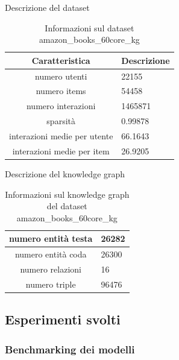 \noindent Descrizione del dataset
\begin{table}[H]
    \centering
    \footnotesize
    \begin{tabularx}{\textwidth}{|c|X|}
        \hline
        \textbf{Caratteristica} & \textbf{Descrizione} \\
        \hline
        numero utenti & 22155 \\
        \hline
        numero items & 54458 \\
        \hline
        numero interazioni & 1465871 \\
        \hline
        sparsità & 0.99878 \\
        \hline
        interazioni medie per utente & 66.1643\\
        \hline
        interazioni medie per item & 26.9205 \\
        \hline
    \end{tabularx}
    \caption{Informazioni sul dataset amazon\_books\_60core\_kg}
    \label{tab:dataset_info}
\end{table}

\noindent Descrizione del knowledge graph
\begin{table}[H]
    \centering
    \footnotesize
    \begin{tabularx}{\textwidth}{|c|X|}
        \hline
        numero entità testa & 26282 \\
        \hline
        numero entità coda & 26300 \\
        \hline
        numero relazioni & 16 \\
        \hline
        numero triple & 96476 \\
        \hline
    \end{tabularx}
    \caption{Informazioni sul knowledge graph del dataset amazon\_books\_60core\_kg}
    \label{tab:dataset_info}
\end{table}


\subsection{Esperimenti svolti}
\subsubsection{Benchmarking dei modelli}

